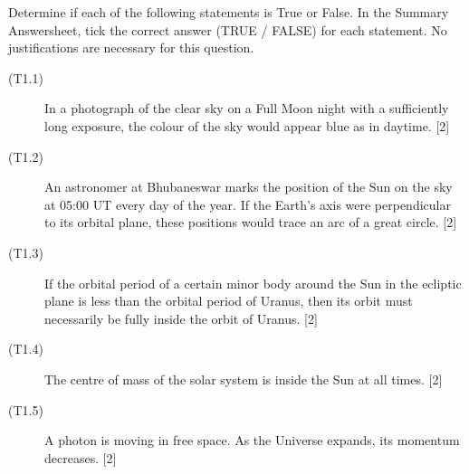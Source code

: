 Determine if each of the following statements is True or False. In the Summary
Answersheet, tick the correct answer (TRUE / FALSE) for each statement. No
justifications are necessary for this question.

\begin{description}
\item[(T1.1)] In a photograph of the clear sky on a Full Moon night with a
  sufficiently long exposure, the colour of the sky would appear blue as in
  daytime. \hfill[2]
\item[(T1.2)] An astronomer at Bhubaneswar marks the position of the Sun on
  the sky at 05:00 UT every day of the year. If the Earth's axis were
  perpendicular to its orbital plane, these positions would trace an arc of a
  great circle. \hfill[2]
\item[(T1.3)] If the orbital period of a certain minor body around the Sun in
  the ecliptic plane is less than the orbital period of Uranus, then its orbit
  must necessarily be fully inside the orbit of Uranus. \hfill[2]
\item[(T1.4)] The centre of mass of the solar system is inside the Sun at all
  times. \hfill[2]
\item[(T1.5)] A photon is moving in free space. As the Universe expands, its
  momentum decreases. \hfill[2]
\end{description}
